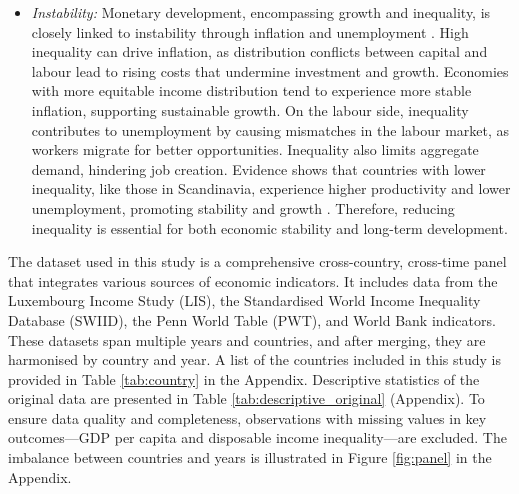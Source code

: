 \begin{itemize}
    \item \textit{Instability:} Monetary development, encompassing growth and inequality, is closely linked to instability through inflation and unemployment \parencite{rolim2024inflation}. High inequality can drive inflation, as distribution conflicts between capital and labour lead to rising costs that undermine investment and growth. Economies with more equitable income distribution tend to experience more stable inflation, supporting sustainable growth. On the labour side, inequality contributes to unemployment by causing mismatches in the labour market, as workers migrate for better opportunities. Inequality also limits aggregate demand, hindering job creation. Evidence shows that countries with lower inequality, like those in Scandinavia, experience higher productivity and lower unemployment, promoting stability and growth \parencite{galbraith2016inequality}. Therefore, reducing inequality is essential for both economic stability and long-term development.
\end{itemize}

The dataset used in this study is a comprehensive cross-country, cross-time panel that integrates various sources of economic indicators. It includes data from the Luxembourg Income Study (LIS), the Standardised World Income Inequality Database (SWIID), the Penn World Table (PWT), and World Bank indicators. These datasets span multiple years and countries, and after merging, they are harmonised by country and year. A list of the countries included in this study is provided in Table \ref{tab:country} in the Appendix. Descriptive statistics of the original data are presented in Table \ref{tab:descriptive_original} (Appendix). To ensure data quality and completeness, observations with missing values in key outcomes—GDP per capita and disposable income inequality—are excluded. The imbalance between countries and years is illustrated in Figure \ref{fig:panel} in the Appendix.



